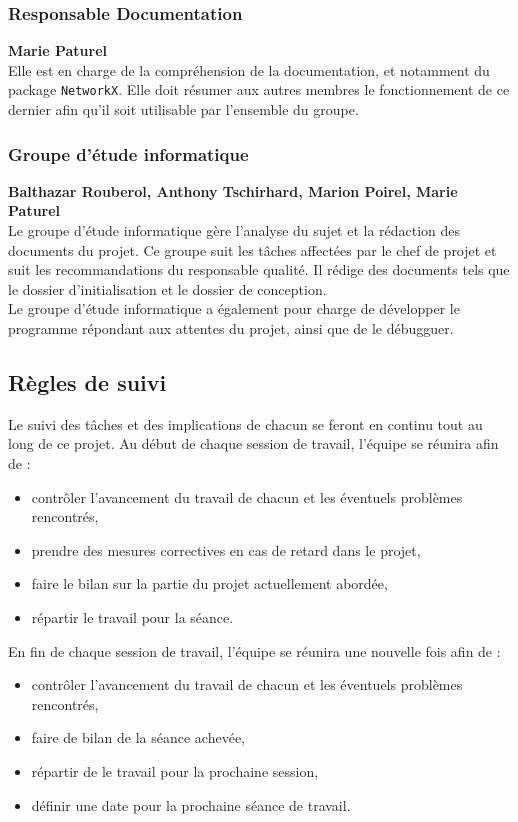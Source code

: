 \subsubsection{Responsable Documentation}
\textbf{Marie Paturel}\\
Elle est en charge de la compréhension de la documentation, et notamment du package \texttt{NetworkX}. Elle doit résumer aux autres membres le fonctionnement de ce dernier afin qu'il soit utilisable par l'ensemble du groupe.

\subsubsection{Groupe d'étude informatique}
\textbf{Balthazar Rouberol, Anthony Tschirhard, Marion Poirel, Marie Paturel}\\
Le groupe d'étude informatique gère l'analyse du sujet et la rédaction des documents du projet. Ce groupe suit les tâches affectées par le chef de projet et suit les recommandations du responsable qualité. Il rédige des documents tels que le dossier d'initialisation et le dossier de conception.\\
Le groupe d'étude informatique a également pour charge de développer le programme répondant aux attentes du projet, ainsi que de le débugguer.


\subsection{Règles de suivi}
Le suivi des tâches et des implications de chacun se feront en continu tout au long de ce projet. Au début de chaque session de travail, l'équipe se réunira afin de :
\begin{itemize}
  \item contrôler l'avancement du travail de chacun et les éventuels problèmes rencontrés,
  \item prendre des mesures correctives en cas de retard dans le projet,
  \item faire le bilan sur la partie du projet actuellement abordée,
  \item répartir le travail pour la séance.
\end{itemize}

\medskip
En fin de chaque session de travail, l'équipe se réunira une nouvelle fois afin de :
\begin{itemize}
  \item contrôler l'avancement du travail de chacun et les éventuels problèmes rencontrés,
  \item faire de bilan de la séance achevée,
  \item répartir de le travail pour la prochaine session,
  \item définir une date pour la prochaine séance de travail.
\end{itemize}

